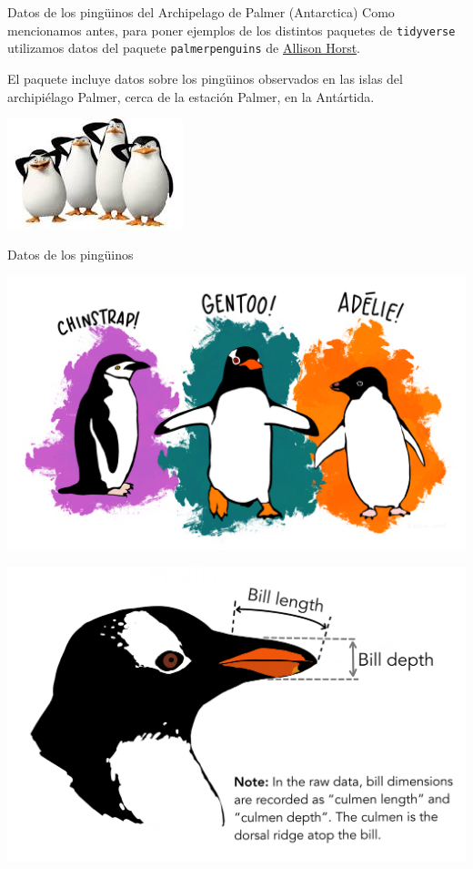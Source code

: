 \documentclass[
  ignorenonframetext,
  aspectratio=169]{beamer}
\begin{document}
\begin{frame}[fragile]{Datos de los pingüinos del Archipelago de Palmer
(Antarctica)}
\protect\hypertarget{datos-de-los-pinguxfcinos-del-archipelago-de-palmer-antarctica}{}
Como mencionamos antes, para poner ejemplos de los distintos paquetes de
\texttt{tidyverse} utilizamos datos del paquete \texttt{palmerpenguins}
de \href{https://allisonhorst.github.io/palmerpenguins/}{Allison Horst}.

El paquete incluye datos sobre los pingüinos observados en las islas del
archipiélago Palmer, cerca de la estación Palmer, en la Antártida.

\begin{center}\includegraphics[width=0.3\linewidth]{Imgs/pinguinos_madagascar} \end{center}
\end{frame}

\begin{frame}{Datos de los pingüinos}
\protect\hypertarget{datos-de-los-pinguxfcinos}{}
\begin{center}\includegraphics[width=0.35\linewidth]{Imgs/lter_penguins} \end{center}

\begin{center}\includegraphics[width=0.35\linewidth]{Imgs/culmen_depth} \end{center}
\end{frame}
\end{document}
